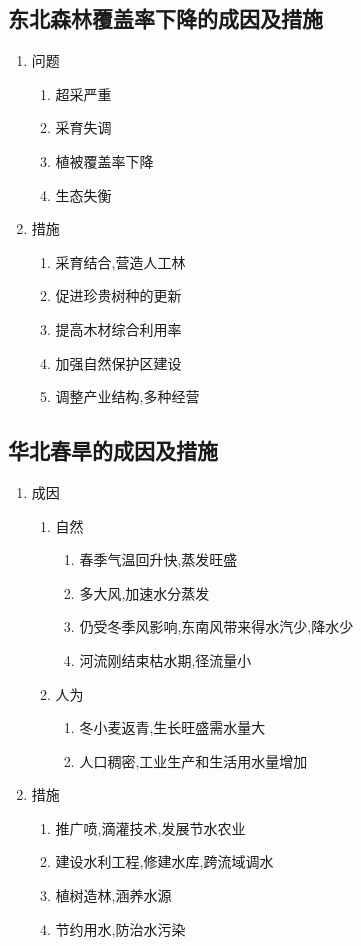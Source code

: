 \documentclass[a4paper]{article}
\begin{document}
    \subsection{东北森林覆盖率下降的成因及措施}
    \begin{enumerate}
        \item 问题
        \begin{enumerate}
            \item 超采严重
            \item 采育失调
            \item 植被覆盖率下降
            \item 生态失衡
        \end{enumerate}
        \item 措施
        \begin{enumerate}
            \item 采育结合,营造人工林
            \item 促进珍贵树种的更新
            \item 提高木材综合利用率
            \item 加强自然保护区建设
            \item 调整产业结构,多种经营
        \end{enumerate}
    \end{enumerate}
    \subsection{华北春旱的成因及措施}
    \begin{enumerate}
        \item 成因
        \begin{enumerate}
            \item 自然
            \begin{enumerate}
                \item 春季气温回升快,蒸发旺盛
                \item 多大风,加速水分蒸发
                \item 仍受冬季风影响,东南风带来得水汽少,降水少 %
                \item 河流刚结束枯水期,径流量小
            \end{enumerate}
            \item 人为
            \begin{enumerate}
                \item 冬小麦返青,生长旺盛需水量大
                \item 人口稠密,工业生产和生活用水量增加
            \end{enumerate}
        \end{enumerate}
        \item 措施
        \begin{enumerate}
            \item 推广喷,滴灌技术,发展节水农业
            \item 建设水利工程,修建水库,跨流域调水
            \item 植树造林,涵养水源
            \item 节约用水,防治水污染
        \end{enumerate}
    \end{enumerate}
\end{document}

